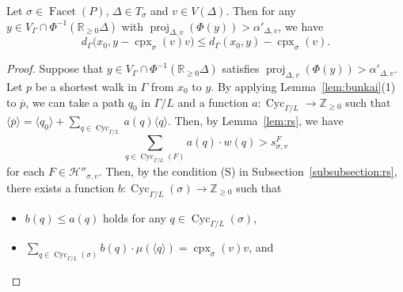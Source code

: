\begin{thm}\label{thm:gen}
Let $\sigma \in \operatorname{Facet}(P)$, $\Delta \in T_{\sigma}$ and $v \in V(\Delta)$. 
Then for any $y \in V_{\Gamma} \cap \Phi ^{-1}(\mathbb{R}_{\ge 0} \Delta)$ with $\operatorname{proj}_{\Delta, v} (\Phi(y)) > \alpha ' _{\Delta, v}$, we have  
\[
d_{\Gamma}\bigl( x_0, y - \operatorname{cpx}_{\sigma}(v)v \bigr) 
\le d_{\Gamma}( x_0, y) - \operatorname{cpx}_{\sigma}(v). 
\]
\end{thm}
\begin{proof}
Suppose that $y \in V_{\Gamma} \cap \Phi ^{-1}(\mathbb{R}_{\ge 0} \Delta)$ satisfies $\operatorname{proj}_{\Delta, v} (\Phi(y)) > \alpha' _{\Delta, v}$. 
Let $p$ be a shortest walk in $\Gamma$ from $x_0$ to $y$. 
By applying Lemma~\ref{lem:bunkai}(1) to $\overline{p}$, 
we can take a path $q_0$ in $\Gamma /L$ and a function $a : \operatorname{Cyc}_{\Gamma /L} \to \mathbb{Z}_{\ge 0}$ 
such that $\langle \overline{p} \rangle = \langle q_0 \rangle + \sum _{q \in \operatorname{Cyc}_{\Gamma /L}} a(q) \langle q \rangle$. 
Then, by Lemma~\ref{lem:rs}, we have 
\[
\sum _{q \in \operatorname{Cyc}_{\Gamma /L}(F)} a(q) \cdot w(q) > s^{F} _{\sigma, v}
\]
for each $F \in \mathcal{H}'' _{\sigma, v}$. 
Then, by the condition (S) in Subsection~\ref{subsubsection:rs}, 
there exists a function $b: \operatorname{Cyc}_{\Gamma /L}(\sigma) \to \mathbb{Z}_{\ge 0}$ such that 
\begin{itemize}
\item 
$b(q) \le a(q)$ holds for any $q \in \operatorname{Cyc}_{\Gamma /L}(\sigma)$, 

\item 
$\sum _{q \in \operatorname{Cyc}_{\Gamma /L}(\sigma)} b(q) \cdot \mu(\langle q \rangle) = \operatorname{cpx}_{\sigma}(v) v$, and 


\end{itemize}
\end{proof}
